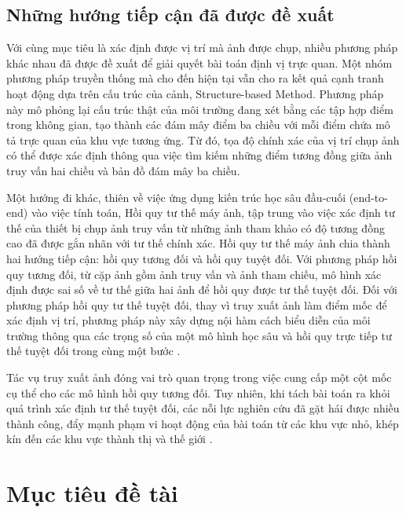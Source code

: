 \subsection{Những hướng tiếp cận đã được đề xuất}

Với cùng mục tiêu là xác định được vị trí mà ảnh được chụp, nhiều phương pháp khác nhau đã được đề xuất để giải quyết bài toán định vị trực quan. Một nhóm phương pháp truyền thống mà cho đến hiện tại vẫn cho ra kết quả cạnh tranh hoạt động dựa trên cấu trúc của cảnh, Structure-based Method. Phương pháp này mô phỏng lại cấu trúc thật của môi trường đang xét bằng các tập hợp điểm trong không gian, tạo thành các đám mây điểm ba chiều với mỗi điểm chứa mô tả trực quan của khu vực tương ứng. Từ đó, tọa độ chính xác của vị trí chụp ảnh có thể được xác định thông qua việc tìm kiếm những điểm tương đồng giữa ảnh truy vấn hai chiều và bản đồ đám mây ba chiều.

Một hướng đi khác, thiên về việc ứng dụng kiến trúc học sâu đầu-cuối (end-to-end) vào việc tính toán, Hồi quy tư thế máy ảnh, tập trung vào việc xác định tư thế của thiết bị chụp ảnh truy vấn từ những ảnh tham khảo có độ tương đồng cao đã được gắn nhãn với tư thế chính xác. Hồi quy tư thế máy ảnh chia thành hai hướng tiếp cận: hồi quy tương đối và hồi quy tuyệt đối. Với phương pháp hồi quy tương đối, từ cặp ảnh gồm ảnh truy vấn và ảnh tham chiếu, mô hình xác định được sai số về tư thế giữa hai ảnh \cite{zhou2020learn} để hồi quy được tư thế tuyệt đối. Đối với phương pháp hồi quy tư thế tuyệt đối, thay vì truy xuất ảnh làm điểm mốc để xác định vị trí, phương pháp này xây dựng nội hàm cách biểu diễn của môi trường thông qua các trọng số của một mô hình học sâu và hồi quy trực tiếp tư thế tuyệt đối trong cùng một bước \cite{kendall2016posenet}.

Tác vụ truy xuất ảnh đóng vai trò quan trọng trong việc cung cấp một cột mốc cụ thể cho các mô hình hồi quy tương đối. Tuy nhiên, khi tách bài toán ra khỏi quá trình xác định tư thế tuyệt đối, các nỗi lực nghiên cứu đã gặt hái được nhiều thành công, đẩy mạnh phạm vi hoạt động của bài toán từ các khu vực nhỏ, khép kín đến các khu vực thành thị và thế giới \cite{berton2022rethinking, keetha2023anyloc, alibey2023mixvpr}.

\section{Mục tiêu đề tài}

